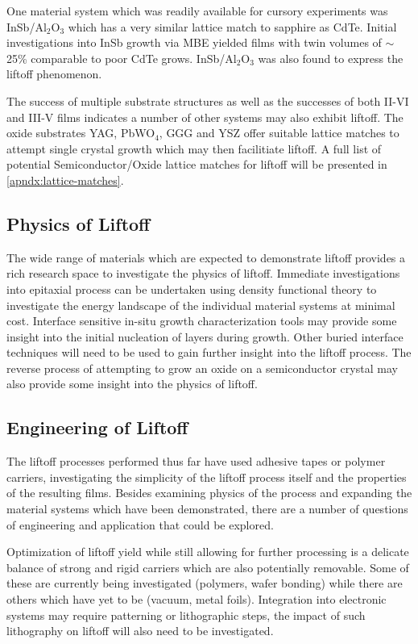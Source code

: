 One material system which was readily available for cursory experiments was InSb/Al$_2$O$_3$ which has a very similar lattice match to sapphire as CdTe. Initial investigations into InSb growth via MBE yielded films with twin volumes of $\sim$25\% comparable to poor CdTe grows. InSb/Al$_2$O$_3$ was also found to express the liftoff phenomenon.

The success of multiple substrate structures as well as the successes of both II-VI and III-V films indicates a number of other systems may also exhibit liftoff. The oxide substrates YAG, PbWO$_4$, GGG and YSZ offer suitable lattice matches to attempt single crystal growth which may then facilitiate liftoff. A full list of potential Semiconductor/Oxide lattice matches for liftoff will be presented in \cref{apndx:lattice-matches}.

\subsection{Physics of Liftoff}
The wide range of materials which are expected to demonstrate liftoff provides a rich research space to investigate the physics of liftoff. Immediate investigations into epitaxial process can be undertaken using density functional theory to investigate the energy landscape of the individual material systems at minimal cost. Interface sensitive in-situ growth characterization tools may provide some insight into the initial nucleation of layers during growth. Other buried interface techniques will need to be used to gain further insight into the liftoff process. The reverse process of attempting to grow an oxide on a semiconductor crystal may also provide some insight into the physics of liftoff.

\subsection{Engineering of Liftoff}
The liftoff processes performed thus far have used adhesive tapes or polymer carriers, investigating the simplicity of the liftoff process itself and the properties of the resulting films. Besides examining physics of the process and  expanding the material systems which have been demonstrated, there are a number of questions of engineering and application that could be explored.

Optimization of liftoff yield while still allowing for further processing is a delicate balance of strong and rigid carriers which are also potentially removable. Some of these are currently being investigated (polymers, wafer bonding) while there are others which have yet to be (vacuum, metal foils). Integration into electronic systems may require patterning or lithographic steps, the impact of such lithography on liftoff will also need to be investigated.

